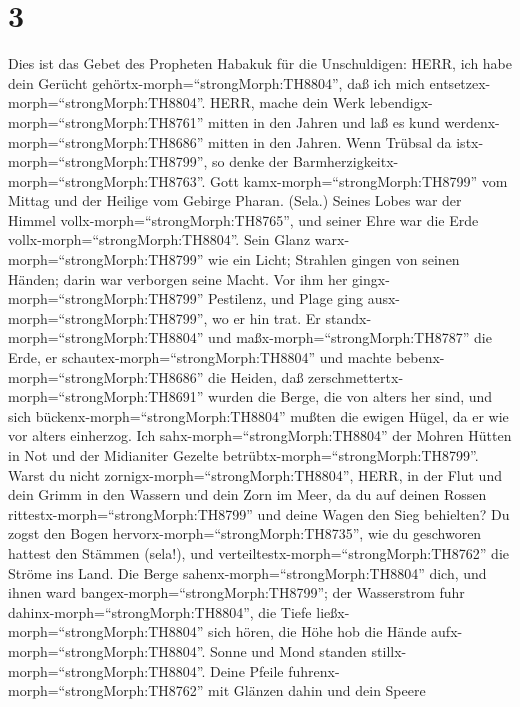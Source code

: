 \hypertarget{section-2}{%
\section{3}\label{section-2}}

 Dies ist das Gebet des Propheten Habakuk für die
Unschuldigen:  HERR, ich habe dein Gerücht
gehörtx-morph=``strongMorph:TH8804'', daß ich mich
entsetzex-morph=``strongMorph:TH8804''. HERR, mache dein Werk
lebendigx-morph=``strongMorph:TH8761'' mitten in den Jahren und laß es
kund werdenx-morph=``strongMorph:TH8686'' mitten in den Jahren. Wenn
Trübsal da istx-morph=``strongMorph:TH8799'', so denke der
Barmherzigkeitx-morph=``strongMorph:TH8763''.  Gott
kamx-morph=``strongMorph:TH8799'' vom Mittag und der Heilige vom Gebirge
Pharan. (Sela.) Seines Lobes war der Himmel
vollx-morph=``strongMorph:TH8765'', und seiner Ehre war die Erde
vollx-morph=``strongMorph:TH8804''.  Sein Glanz
warx-morph=``strongMorph:TH8799'' wie ein Licht; Strahlen gingen von
seinen Händen; darin war verborgen seine Macht.  Vor ihm her
gingx-morph=``strongMorph:TH8799'' Pestilenz, und Plage ging
ausx-morph=``strongMorph:TH8799'', wo er hin trat.  Er
standx-morph=``strongMorph:TH8804'' und
maßx-morph=``strongMorph:TH8787'' die Erde, er
schautex-morph=``strongMorph:TH8804'' und machte
bebenx-morph=``strongMorph:TH8686'' die Heiden, daß
zerschmettertx-morph=``strongMorph:TH8691'' wurden die Berge, die von
alters her sind, und sich bückenx-morph=``strongMorph:TH8804'' mußten
die ewigen Hügel, da er wie vor alters einherzog.  Ich
sahx-morph=``strongMorph:TH8804'' der Mohren Hütten in Not und der
Midianiter Gezelte betrübtx-morph=``strongMorph:TH8799''. 
Warst du nicht zornigx-morph=``strongMorph:TH8804'', HERR, in der Flut
und dein Grimm in den Wassern und dein Zorn im Meer, da du auf deinen
Rossen rittestx-morph=``strongMorph:TH8799'' und deine Wagen den Sieg
behielten?  Du zogst den Bogen
hervorx-morph=``strongMorph:TH8735'', wie du geschworen hattest den
Stämmen (sela!), und verteiltestx-morph=``strongMorph:TH8762'' die
Ströme ins Land.  Die Berge
sahenx-morph=``strongMorph:TH8804'' dich, und ihnen ward
bangex-morph=``strongMorph:TH8799''; der Wasserstrom fuhr
dahinx-morph=``strongMorph:TH8804'', die Tiefe
ließx-morph=``strongMorph:TH8804'' sich hören, die Höhe hob die Hände
aufx-morph=``strongMorph:TH8804''.  Sonne und Mond standen
stillx-morph=``strongMorph:TH8804''. Deine Pfeile
fuhrenx-morph=``strongMorph:TH8762'' mit Glänzen dahin und dein Speere
